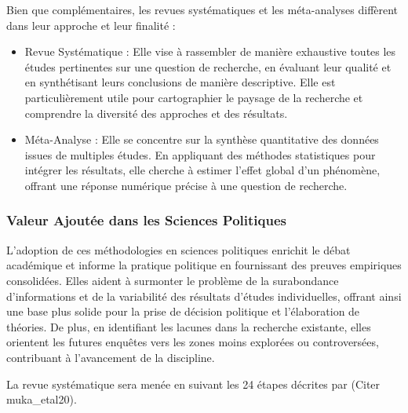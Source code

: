 \documentclass[
  letterpaper,
]{scrbook}
\begin{document}
Bien que complémentaires, les revues systématiques et les méta-analyses
diffèrent dans leur approche et leur finalité :

\begin{itemize}
\item
  Revue Systématique : Elle vise à rassembler de manière exhaustive
  toutes les études pertinentes sur une question de recherche, en
  évaluant leur qualité et en synthétisant leurs conclusions de manière
  descriptive. Elle est particulièrement utile pour cartographier le
  paysage de la recherche et comprendre la diversité des approches et
  des résultats.
\item
  Méta-Analyse : Elle se concentre sur la synthèse quantitative des
  données issues de multiples études. En appliquant des méthodes
  statistiques pour intégrer les résultats, elle cherche à estimer
  l'effet global d'un phénomène, offrant une réponse numérique précise à
  une question de recherche.
\end{itemize}

\hypertarget{valeur-ajoutuxe9e-dans-les-sciences-politiques}{%
\subsubsection{Valeur Ajoutée dans les Sciences
Politiques}\label{valeur-ajoutuxe9e-dans-les-sciences-politiques}}

L'adoption de ces méthodologies en sciences politiques enrichit le débat
académique et informe la pratique politique en fournissant des preuves
empiriques consolidées. Elles aident à surmonter le problème de la
surabondance d'informations et de la variabilité des résultats d'études
individuelles, offrant ainsi une base plus solide pour la prise de
décision politique et l'élaboration de théories. De plus, en identifiant
les lacunes dans la recherche existante, elles orientent les futures
enquêtes vers les zones moins explorées ou controversées, contribuant à
l'avancement de la discipline.

La revue systématique sera menée en suivant les 24 étapes décrites par
(Citer muka\_etal20).
\end{document}
